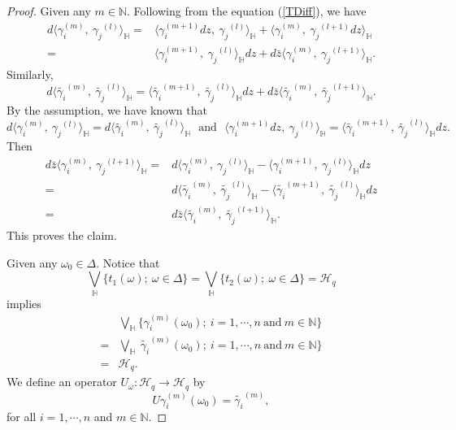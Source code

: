 \documentclass[pdflatex,sn-mathphys-num]{sn-jnl}%
\theoremstyle{thmstyleone}%
\theoremstyle{thmstyletwo}%
\theoremstyle{thmstylethree}%
\theoremstyle{definition}
\theoremstyle{remark}
\begin{document}
\begin{proof}
Given any $m\in\mathbb{N}$. Following from the equation (\ref{TDiff}), we have
    \[
    \begin{aligned}
	d\langle\gamma_i^{(m)}, \ {\gamma_j}^{(l)}\rangle_{\mathbb{H}}=&\langle\gamma_i^{(m+1)}dz, \ {\gamma_j}^{(l)}\rangle_{\mathbb{H}}+\langle\gamma_i^{(m)}, \ {\gamma_j}^{(l+1)}dz\rangle_{\mathbb{H}} \\
	=&\langle\gamma_i^{(m+1)}, \ {\gamma_j}^{(l)}\rangle_{\mathbb{H}}dz+d\bar{z}\langle\gamma_i^{(m)}, \ {\gamma_j}^{(l+1)}\rangle_{\mathbb{H}}.
	\end{aligned}
\]
Similarly,
    \[
	d\langle\widetilde{\gamma_i}^{(m)}, \ \widetilde{\gamma_j}^{(l)}\rangle_{\mathbb{H}}=\langle\widetilde{\gamma_i}^{(m+1)}, \ \widetilde{\gamma_j}^{(l)}\rangle_{\mathbb{H}}dz+d\bar{z}\langle\widetilde{\gamma_i}^{(m)}, \ \widetilde{\gamma_j}^{(l+1)}\rangle_{\mathbb{H}}.
\]
By the assumption, we have known that
\[
d\langle\gamma_i^{(m)}, \ {\gamma_j}^{(l)}\rangle_{\mathbb{H}}=d\langle\widetilde{\gamma_i}^{(m)}, \ \widetilde{\gamma_j}^{(l)}\rangle_{\mathbb{H}} \ \ \ \text{and} \ \ \ \langle\gamma_i^{(m+1)}dz, \ {\gamma_j}^{(l)}\rangle_{\mathbb{H}}=\langle\widetilde{\gamma_i}^{(m+1)}, \ \widetilde{\gamma_j}^{(l)}\rangle_{\mathbb{H}}dz.
\]
Then
    \[
\begin{aligned}
	d\bar{z}\langle\gamma_i^{(m)}, \ {\gamma_j}^{(l+1)}\rangle_{\mathbb{H}}=&d\langle\gamma_i^{(m)}, \ {\gamma_j}^{(l)}\rangle_{\mathbb{H}}-\langle\gamma_i^{(m+1)}, \ {\gamma_j}^{(l)}\rangle_{\mathbb{H}}dz \\
	=& 	d\langle\widetilde{\gamma_i}^{(m)}, \ \widetilde{\gamma_j}^{(l)}\rangle_{\mathbb{H}}-\langle\widetilde{\gamma_i}^{(m+1)}, \ \widetilde{\gamma_j}^{(l)}\rangle_{\mathbb{H}}dz \\
	=& d\bar{z}\langle\widetilde{\gamma_i}^{(m)}, \ \widetilde{\gamma_j}^{(l+1)}\rangle_{\mathbb{H}}.
\end{aligned}
\]
This proves the claim.

Given any $\omega_0\in\Delta$. Notice that
\[
{\bigvee}_{\mathbb{H}}\{ t_1(\omega);\ \omega\in\Delta\}={\bigvee}_{\mathbb{H}}\{ t_2(\omega);\ \omega\in\Delta\}=\mathcal{H}_q
\]
implies
\[
\begin{aligned}
& {\bigvee}_{\mathbb{H}}\{\gamma_i^{(m)}(\omega_0);\ i=1,\cdots,n \ \text{and} \ m\in\mathbb{N}\} \\
=&{\bigvee}_{\mathbb{H}}\ \widetilde{\gamma_i}^{(m)}(\omega_0);\ i=1,\cdots,n \ \text{and} \ m\in\mathbb{N}\} \\
=&\mathcal{H}_q.
\end{aligned}
\]
We define an operator $U_{\omega}:\mathcal{H}_q\rightarrow \mathcal{H}_q$ by
\[
U\gamma_i^{(m)}(\omega_0)=\widetilde{\gamma_i}^{(m)},
\]
for all $i=1,\cdots,n$ and $m\in\mathbb{N}$.


\end{proof}
\end{document}
